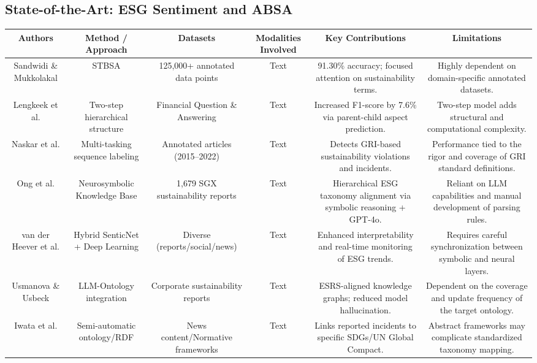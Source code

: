 \documentclass{article}
\begin{document}
\subsection{State-of-the-Art: ESG Sentiment and ABSA}
\begin{table}[h!]
\centering
\begin{tabular}{|c|c|c|c|c|c|}
\hline
Authors & Method / Approach & Datasets & Modalities Involved & Key Contributions & Limitations \\ \hline
Sandwidi \& Mukkolakal  \parencite{blaise_sandwidi_c58b16e0} & STBSA & 125,000+ annotated data points & Text & 91.30\% accuracy; focused attention on sustainability terms. & Highly dependent on domain-specific annotated datasets. \\ \hline
Lengkeek et al.  \parencite{matteo_lengkeek_5d9f2a4e} & Two-step hierarchical structure & Financial Question \& Answering & Text & Increased F1-score by 7.6\% via parent-child aspect prediction. & Two-step model adds structural and computational complexity. \\ \hline
Naskar et al.  \parencite{abir_naskar_17efeb7b} & Multi-tasking sequence labeling & Annotated articles (2015–2022) & Text & Detects GRI-based sustainability violations and incidents. & Performance tied to the rigor and coverage of GRI standard definitions. \\ \hline
Ong et al.  \parencite{keane_ong_8fec4760} & Neurosymbolic Knowledge Base & 1,679 SGX sustainability reports & Text & Hierarchical ESG taxonomy alignment via symbolic reasoning + GPT-4o. & Reliant on LLM capabilities and manual development of parsing rules. \\ \hline
van der Heever et al.  \parencite{wihan_van_der_heever_5ff35709} & Hybrid SenticNet + Deep Learning & Diverse (reports/social/news) & Text & Enhanced interpretability and real-time monitoring of ESG trends. & Requires careful synchronization between symbolic and neural layers. \\ \hline
Usmanova \& Usbeck  \parencite{aida_usmanova_e9b44e1d} & LLM-Ontology integration & Corporate sustainability reports & Text & ESRS-aligned knowledge graphs; reduced model hallucination. & Dependent on the coverage and update frequency of the target ontology. \\ \hline
Iwata et al.  \parencite{tsuyoshi_iwata_18ccc0b8} & Semi-automatic ontology/RDF & News content/Normative frameworks & Text & Links reported incidents to specific SDGs/UN Global Compact. & Abstract frameworks may complicate standardized taxonomy mapping. \\ \hline

\end{tabular}
\end{table}
\end{document}
